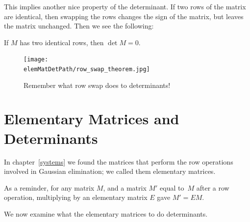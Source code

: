 This implies another nice property of the determinant.  If two rows of the matrix are identical, then swapping the rows changes the sign of the matrix, but leaves the matrix unchanged.  Then we see the following:
\begin{theorem}
If $M$ has two identical rows, then $\det M = 0$.
\end{theorem}


\begin{figure}
\begin{center}
\texttt{[image: \\elemMatDetPath/row\_swap\_theorem.jpg]}
\end{center}
\caption{Remember what row swap does to determinants!}
\end{figure}

\section{Elementary Matrices and Determinants}

In chapter~\ref{systems} we found
the matrices that perform the  row operations involved in Gaussian elimination; we called them elementary matrices.

As a reminder, for any matrix $M$, and a matrix $M'$ equal to~$M$ after a row operation, multiplying by an elementary matrix $E$ gave $M'=EM$.


We now examine what the elementary matrices to do determinants.

